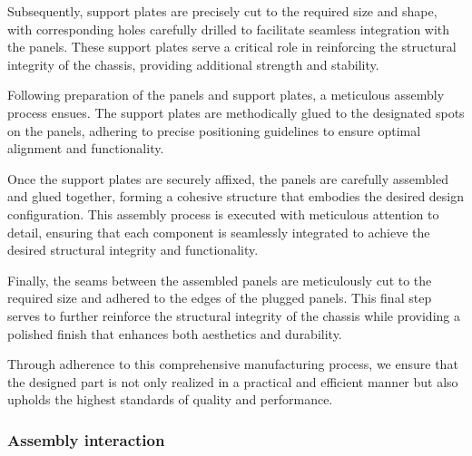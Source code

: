 Subsequently, support plates are precisely cut to the required size and shape, with corresponding holes carefully drilled to facilitate seamless integration with the panels. These support plates serve a critical role in reinforcing the structural integrity of the chassis, providing additional strength and stability.

Following preparation of the panels and support plates, a meticulous assembly process ensues. The support plates are methodically glued to the designated spots on the panels, adhering to precise positioning guidelines to ensure optimal alignment and functionality.

Once the support plates are securely affixed, the panels are carefully assembled and glued together, forming a cohesive structure that embodies the desired design configuration. This assembly process is executed with meticulous attention to detail, ensuring that each component is seamlessly integrated to achieve the desired structural integrity and functionality.

Finally, the seams between the assembled panels are meticulously cut to the required size and adhered to the edges of the plugged panels. This final step serves to further reinforce the structural integrity of the chassis while providing a polished finish that enhances both aesthetics and durability.

Through adherence to this comprehensive manufacturing process, we ensure that the designed part is not only realized in a practical and efficient manner but also upholds the highest standards of quality and performance.

\subsubsection{Assembly interaction}


